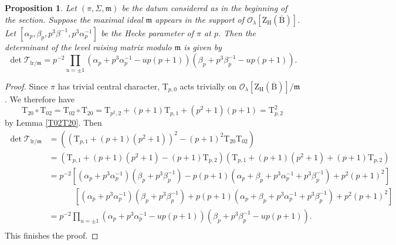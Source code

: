 \documentclass[10pt]{amsart}
\numberwithin{equation}{section}
\newtheorem{proposition}[equation]{Proposition}
\theoremstyle{definition}
\def\calO{\mathcal{O}}
\def\calT{\mathcal{T}}
\def\fracm{\mathfrak{m}}
\def\rmB{\mathrm{B}}
\def\rmH{\mathrm{H}}
\def\rmT{\mathrm{T}}
\def\rmZ{\mathrm{Z}}
\begin{document}
\begin{proposition}\label{det-lr}
Let $(\pi, \Sigma, \fracm)$ be the datum considered as in the beginning of the section. Suppose the maximal ideal $\fracm$ appears in the support of $\calO_{\lambda}[\rmZ_{\rmH}(\overline{\rmB})]$. Let $[\alpha_{p}, \beta_{p}, p^{3}\beta^{-1}, p^{3}\alpha^{-1}_{p}]$ be the Hecke parameter of $\pi$ at $p$. Then the determinant of the level raising matrix modulo $\fracm$ is given by
\begin{equation*}
\det \calT_{\mathrm{lr}/\fracm}= p^{-2}\prod_{u=\pm1}(\alpha_{p}+p^{3}\alpha^{-1}_{p}-up(p+1))(\beta_{p}+p^{3}\beta^{-1}_{p}-up(p+1)).
\end{equation*}
\end{proposition}
\begin{proof}
Since $\pi$ has trivial central character, $\rmT_{p,0}$ acts trivially on $\calO_{\lambda}[\rmZ_{\rmH}(\overline{\rmB})]/\fracm$. We therefore have 
\begin{equation*}
\rmT_{20}\circ\rmT_{02}= \rmT_{02}\circ\rmT_{20}=\rmT_{p^{2}, 2}+(p+1)\rmT_{p, 1}+(p^{2}+1)(p+1)=\rmT^{2}_{p,2} 
\end{equation*}
by Lemma \ref{T02T20}. Then
\begin{equation*}
\begin{aligned}
\det \calT_{\mathrm{lr}/\fracm}&= ((\rmT_{p,1}+(p+1)(p^{2}+1))^{2}-(p+1)^{2}\rmT_{20}\rmT_{02})\\
&=(\rmT_{p,1}+(p+1)(p^{2}+1)-(p+1)\rmT_{p,2})(\rmT_{p,1}+(p+1)(p^{2}+1)+(p+1)\rmT_{p,2})\\
&=p^{-2}[(\alpha_{p}+p^{3}\alpha^{-1}_{p})(\beta_{p}+p^{3}\beta^{-1}_{p})-p(p+1)(\alpha_{p}+\beta_{p}+p^{3}\alpha^{-1}_{p}+p^{3}\beta^{-1}_{p})+p^{2}(p+1)^{2}]\\
&\phantom{aaaaaa}[(\alpha_{p}+p^{3}\alpha^{-1}_{p})(\beta_{p}+p^{3}\beta^{-1}_{p})+p(p+1)(\alpha_{p}+\beta_{p}+p^{3}\alpha^{-1}_{p}+p^{3}\beta^{-1}_{p})+p^{2}(p+1)^{2}]\\
&=p^{-2}\prod_{u=\pm1}(\alpha_{p}+p^{3}\alpha^{-1}_{p}-u p(p+1))(\beta_{p}+p^{3}\beta^{-1}_{p}-u p(p+1)).\\
\end{aligned}
\end{equation*}
This finishes the proof.
\end{proof}
\end{document}
